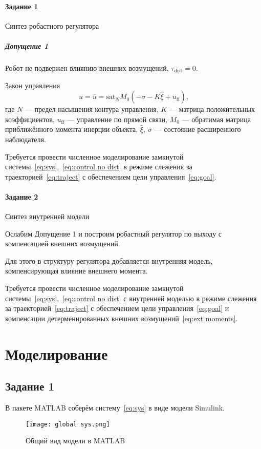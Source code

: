 \documentclass[14pt]{extarticle}
\begin{document}
    \paragraph*{Задание 1} Синтез робастного регулятора

    \subparagraph{Допущение 1} Робот не подвержен влиянию внешних возмущений, $\tau_\text{dist} = 0$.
    \newline

    \noindent Закон управления
    \begin{equation}
        \label{eq:control no dist}
        u = \bar{u} = \text{sat}_N M_0\left( -\sigma - K\hat{\xi} + u_\text{ff} \right),
    \end{equation}
    где $N$ --- предел насыщения контура управления,
    $K$ --- матрица положительных коэффициентов,
    $u_\text{ff}$ --- управление по прямой связи,
    $M_0$ --- обратимая матрица приближённого момента инерции объекта,
    $\hat{\xi},\ \sigma$ --- состояние расширенного наблюдателя.
    \newline

    Требуется провести численное моделирование замкнутой системы~\eqref{eq:sys},~\eqref{eq:control no dist}
    в режиме слежения за траекторией~\eqref{eq:traject} с обеспечением цели управления~\eqref{eq:goal}.

    \paragraph*{Задание 2} Синтез внутренней модели

    Ослабим Допущение 1 и построим робастный регулятор по выходу с компенсацией внешних возмущений.

    Для этого в структуру регулятора добавляется внутренняя модель, компенсирующая влияние внешнего момента.

    Требуется провести численное моделирование замкнутой системы~\eqref{eq:sys},~\eqref{eq:control no dist}
    с внутренней моделью в режиме слежения за траекторией~\eqref{eq:traject} с обеспечением цели управления~\eqref{eq:goal}
    и компенсации детерменированных внешних возмущений~\eqref{eq:ext moments}.

    \section*{Моделирование}
    \subsection*{Задание 1}
    В пакете MATLAB соберём систему~\eqref{eq:sys} в виде модели Simulink.
    \begin{figure}[H]
        \centering
        \texttt{[image: global sys.png]}
        \caption{Общий вид модели в MATLAB}
        \label{pic:global sys}
    \end{figure}
\end{document}
